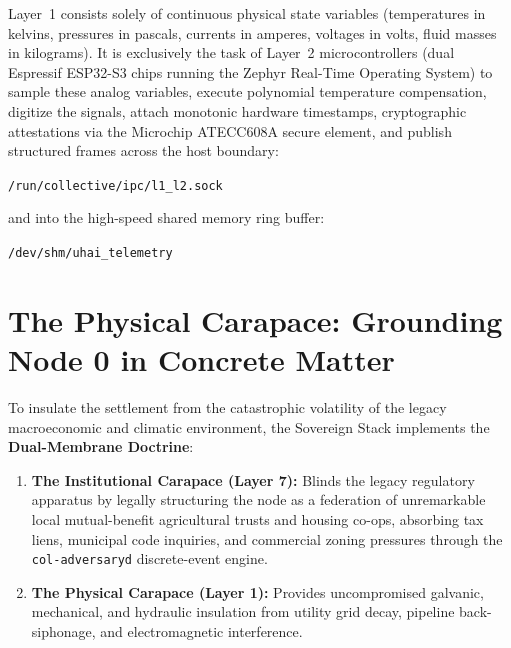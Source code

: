 Layer~1 consists solely of continuous physical state variables (temperatures in kelvins, pressures in pascals, currents in amperes, voltages in volts, fluid masses in kilograms). It is exclusively the task of Layer~2 microcontrollers (dual Espressif ESP32-S3 chips running the Zephyr Real-Time Operating System) to sample these analog variables, execute polynomial temperature compensation, digitize the signals, attach monotonic hardware timestamps, cryptographic attestations via the Microchip ATECC608A secure element, and publish structured frames across the host boundary:
\begin{center}
\texttt{/run/collective/ipc/l1\_l2.sock}
\end{center}
and into the high-speed shared memory ring buffer:
\begin{center}
\texttt{/dev/shm/uhai\_telemetry}
\end{center}

\section{The Physical Carapace: Grounding Node 0 in Concrete Matter}
\label{sec:intro_carapace}

To insulate the settlement from the catastrophic volatility of the legacy macroeconomic and climatic environment, the Sovereign Stack implements the \textbf{Dual-Membrane Doctrine}:
\begin{enumerate}
    \item \textbf{The Institutional Carapace (Layer 7):} Blinds the legacy regulatory apparatus by legally structuring the node as a federation of unremarkable local mutual-benefit agricultural trusts and housing co-ops, absorbing tax liens, municipal code inquiries, and commercial zoning pressures through the \texttt{col-adversaryd} discrete-event engine.
    \item \textbf{The Physical Carapace (Layer 1):} Provides uncompromised galvanic, mechanical, and hydraulic insulation from utility grid decay, pipeline back-siphonage, and electromagnetic interference.
\end{enumerate}

